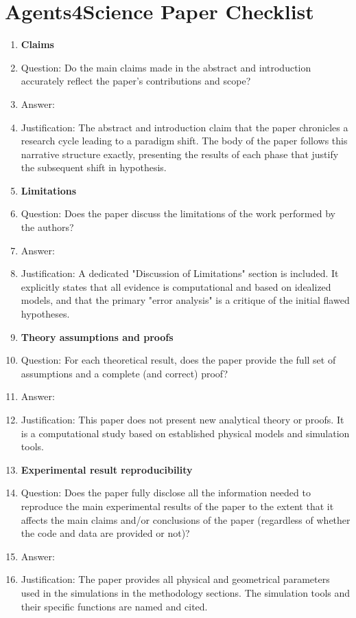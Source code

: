 \documentclass{article}
\begin{document}
\section*{Agents4Science Paper Checklist}
\begin{enumerate}

\item {\bf Claims}
    \item[] Question: Do the main claims made in the abstract and introduction accurately reflect the paper's contributions and scope?
    \item[] Answer: \answerYes{}
    \item[] Justification: The abstract and introduction claim that the paper chronicles a research cycle leading to a paradigm shift. The body of the paper follows this narrative structure exactly, presenting the results of each phase that justify the subsequent shift in hypothesis.

\item {\bf Limitations}
    \item[] Question: Does the paper discuss the limitations of the work performed by the authors?
    \item[] Answer: \answerYes{}
    \item[] Justification: A dedicated "Discussion of Limitations" section is included. It explicitly states that all evidence is computational and based on idealized models, and that the primary "error analysis" is a critique of the initial flawed hypotheses.

\item {\bf Theory assumptions and proofs}
    \item[] Question: For each theoretical result, does the paper provide the full set of assumptions and a complete (and correct) proof?
    \item[] Answer: \answerNA{}
    \item[] Justification: This paper does not present new analytical theory or proofs. It is a computational study based on established physical models and simulation tools.

    \item {\bf Experimental result reproducibility}
    \item[] Question: Does the paper fully disclose all the information needed to reproduce the main experimental results of the paper to the extent that it affects the main claims and/or conclusions of the paper (regardless of whether the code and data are provided or not)?
    \item[] Answer: \answerYes{}
    \item[] Justification: The paper provides all physical and geometrical parameters used in the simulations in the methodology sections. The simulation tools and their specific functions are named and cited.


\end{enumerate}
\end{document}
